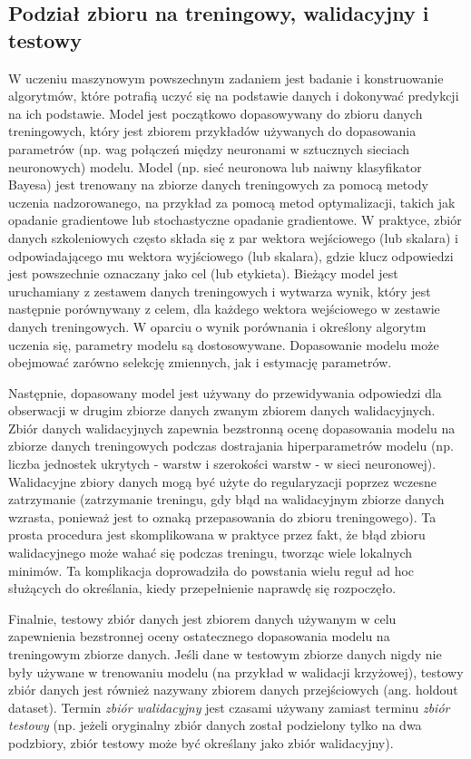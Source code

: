 \documentclass[polish, twoside, 12pt, a4paper]{article}
\theoremstyle{definition}
\theoremstyle{plain}
\theoremstyle{remark}
\begin{document}
\subsection{Podział zbioru na treningowy, walidacyjny i testowy}
\label{chapter:train-test-split}
W uczeniu maszynowym powszechnym zadaniem jest badanie i konstruowanie algorytmów, które potrafią uczyć się na podstawie danych i dokonywać predykcji na ich podstawie. \cite{kohavi1998} Model jest początkowo dopasowywany do zbioru danych treningowych, który jest zbiorem przykładów używanych do dopasowania parametrów (np. wag połączeń między neuronami w sztucznych sieciach neuronowych) modelu. Model (np. sieć neuronowa lub naiwny klasyfikator Bayesa) jest trenowany na zbiorze danych treningowych za pomocą metody uczenia nadzorowanego, na przykład za pomocą metod optymalizacji, takich jak opadanie gradientowe lub stochastyczne opadanie gradientowe. W praktyce, zbiór danych szkoleniowych często składa się z par wektora wejściowego (lub skalara) i odpowiadającego mu wektora wyjściowego (lub skalara), gdzie klucz odpowiedzi jest powszechnie oznaczany jako cel (lub etykieta). Bieżący model jest uruchamiany z zestawem danych treningowych i wytwarza wynik, który jest następnie porównywany z celem, dla każdego wektora wejściowego w zestawie danych treningowych. W oparciu o wynik porównania i określony algorytm uczenia się, parametry modelu są dostosowywane. Dopasowanie modelu może obejmować zarówno selekcję zmiennych, jak i estymację parametrów.

Następnie, dopasowany model jest używany do przewidywania odpowiedzi dla obserwacji w drugim zbiorze danych zwanym zbiorem danych walidacyjnych. Zbiór danych walidacyjnych zapewnia bezstronną ocenę dopasowania modelu na zbiorze danych treningowych podczas dostrajania hiperparametrów modelu (np. liczba jednostek ukrytych - warstw i szerokości warstw - w sieci neuronowej). Walidacyjne zbiory danych mogą być użyte do regularyzacji poprzez wczesne zatrzymanie (zatrzymanie treningu, gdy błąd na walidacyjnym zbiorze danych wzrasta, ponieważ jest to oznaką przepasowania do zbioru treningowego). Ta prosta procedura jest skomplikowana w praktyce przez fakt, że błąd zbioru walidacyjnego może wahać się podczas treningu, tworząc wiele lokalnych minimów. Ta komplikacja doprowadziła do powstania wielu reguł ad hoc służących do określania, kiedy przepełnienie naprawdę się rozpoczęło.

Finalnie, testowy zbiór danych jest zbiorem danych używanym w celu zapewnienia bezstronnej oceny ostatecznego dopasowania modelu na treningowym zbiorze danych. Jeśli dane w testowym zbiorze danych nigdy nie były używane w trenowaniu modelu (na przykład w walidacji krzyżowej), testowy zbiór danych jest również nazywany zbiorem danych przejściowych (ang. holdout dataset). Termin \emph{zbiór walidacyjny} jest czasami używany zamiast terminu \emph{zbiór testowy} (np. jeżeli oryginalny zbiór danych został podzielony tylko na dwa podzbiory, zbiór testowy może być określany jako zbiór walidacyjny).\cite{brownlee2017}
\end{document}

